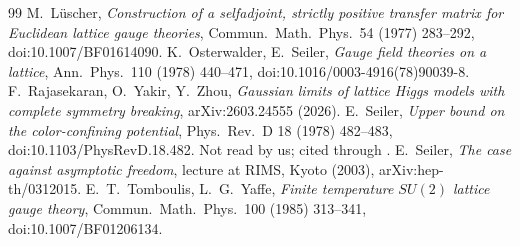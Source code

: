 \documentclass[11pt,a4paper]{article}
\theoremstyle{plain}
\theoremstyle{definition}
\theoremstyle{remark}
\numberwithin{equation}{section}
\begin{document}
{\begin{thebibliography}{99}
 M.~L\"uscher, \emph{Construction of a selfadjoint, strictly positive transfer matrix for Euclidean lattice gauge
theories}, Commun.\ Math.\ Phys.\ 54 (1977) 283--292, doi:10.1007/BF01614090.
 K.~Osterwalder, E.~Seiler, \emph{Gauge field theories on a lattice}, Ann.\ Phys.\ 110 (1978) 440--471,
doi:10.1016/0003-4916(78)90039-8.
 F.~Rajasekaran, O.~Yakir, Y.~Zhou, \emph{Gaussian limits of lattice Higgs models with complete symmetry breaking},
arXiv:2603.24555 (2026).
 E.~Seiler, \emph{Upper bound on the color-confining potential}, Phys.\ Rev.\ D 18 (1978) 482--483,
doi:10.1103/PhysRevD.18.482. Not read by us; cited through \cite[App.~A]{TY85}.
 E.~Seiler, \emph{The case against asymptotic freedom}, lecture at RIMS, Kyoto (2003), arXiv:hep-th/0312015.
 E.~T.~Tomboulis, L.~G.~Yaffe, \emph{Finite temperature $SU(2)$ lattice gauge theory}, Commun.\ Math.\ Phys.\ 100 (1985)
313--341, doi:10.1007/BF01206134.
\end{thebibliography}}
\end{document}
